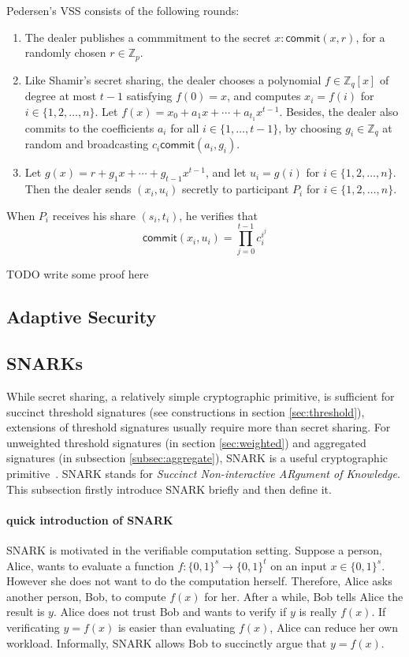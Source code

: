 Pedersen's VSS consists of the following rounds:

\begin{enumerate}
    \item The dealer publishes a commmitment to the secret $x: \mathsf{commit}(x, r)$, for a randomly chosen $r\in\mathbb{Z}_p$. 
    \item Like Shamir's secret sharing, the dealer chooses a polynomial $f\in \mathbb{Z}_q[x]$ of degree at most $t-1$ satisfying $f(0)=x$, and computes $x_i=f(i)$ for $i\in\{1,2,\dots, n\}$. Let $f(x) = x_0 + a_1 x + \cdots + a_{t_1} x^{t-1}$. Besides, the dealer also commits to the coefficients $a_i$ for all $i\in\{1,\dots, t-1\}$, by choosing $g_i\in \mathbb{Z}_q$ at random and broadcasting $c_i\mathsf{commit}(a_i, g_i)$. 
    \item Let $g(x)=r + g_1 x + \cdots + g_{t-1}x^{t-1}$, and let $u_i=g(i)$ for $i\in\{1,2,\dots, n\}$. Then the dealer sends $(x_i, u_i)$ secretly to participant $P_i$ for $i\in\{1,2,\dots, n\}$. 
\end{enumerate}

When $P_i$ receives his share $(s_i, t_i)$, he verifies that 
\begin{equation*}
    \mathsf{commit}(x_i, u_i) = \prod_{j=0}^{t-1} c_i^{i^j}
\end{equation*}  

{\color{red} TODO write some proof here}




\subsection{Adaptive Security}


\subsection{SNARKs}
While secret sharing, a relatively simple cryptographic primitive, is sufficient for succinct threshold signatures (see constructions in section \ref{sec:threshold}), extensions of threshold signatures usually require more than secret sharing. For unweighted threshold signatures (in section \ref{sec:weighted}) and aggregated signatures (in subsection \ref{subsec:aggregate}), SNARK is a useful cryptographic primitive~\cite{DBLP:conf/ccs/DasCXNB023}. SNARK stands for \textit{Succinct Non-interactive ARgument of Knowledge}. This subsection firstly introduce SNARK briefly and then define it. 

\paragraph{quick introduction of SNARK} SNARK is motivated in the verifiable computation setting. Suppose a person, Alice, wants to evaluate a function $f:\{0,1\}^{s}\to \{0,1\}^t$ on an input $x\in \{0,1\}^s$. However she does not want to do the computation herself. Therefore, Alice asks another person, Bob, to compute $f(x)$ for her. After a while, Bob tells Alice the result is $y$. Alice does not trust Bob and wants to verify if $y$ is really $f(x)$. If verificating $y=f(x)$ is easier than evaluating $f(x)$, Alice can reduce her own workload. Informally, SNARK allows Bob to succinctly argue that $y=f(x)$. 

